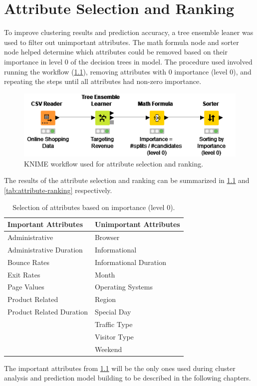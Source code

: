 \documentclass[../cmpe-251-project-report.tex]{subfiles}
\begin{document}
  \chapter{Attribute Selection and Ranking}
  \label{ch:selection-ranking}
  To improve clustering results and prediction accuracy, a tree ensemble leaner was used to filter out unimportant attributes. The math formula node and sorter node helped determine which attributes could be removed based on their importance in level 0 of the decision trees in model. The procedure used involved running the workflow (\cref{fig:selection-ranking-workflow}), removing attributes with 0 importance (level 0), and repeating the steps until all attributes had non-zero importance.
  \begin{figure}
    \includegraphics{img/selection-ranking-workflow.png}
    \caption{KNIME workflow used for attribute selection and ranking.}
    \label{fig:selection-ranking-workflow}
  \end{figure}
  The results of the attribute selection and ranking can be summarized in \cref{tab:attribute-selection} and \cref{tab:attribute-ranking} respectively.
  \begin{table}
    \caption{Selection of attributes based on importance (level 0).}
    \label{tab:attribute-selection}
    \begin{tabular}{ll}
      \toprule
      Important Attributes     & Unimportant Attributes \\
      \midrule
      Administrative           & Browser                \\
      Administrative Duration  & Informational          \\
      Bounce Rates             & Informational Duration \\
      Exit Rates               & Month                  \\
      Page Values              & Operating Systems      \\
      Product Related          & Region                 \\
      Product Related Duration & Special Day            \\
                               & Traffic Type           \\
                               & Visitor Type           \\
                               & Weekend                \\
      \bottomrule
    \end{tabular}
  \end{table}
  The important attributes from \cref{tab:attribute-selection} will be the only ones used during cluster analysis and prediction model building to be described in the following chapters.
\end{document}
